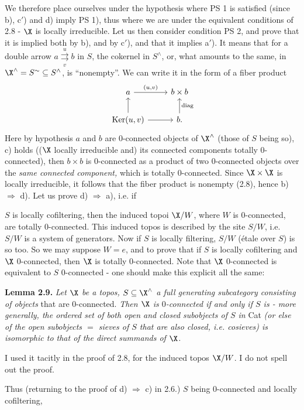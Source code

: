 We therefore place ourselves under the hypothesis where PS 1 is satisfied (since b), c$'$) and d) imply PS 1), thus where we are under the equivalent conditions of 2.8 - $\X$ is locally irreducible. Let us then consider condition PS 2, and prove that it is implied both by b), and by c$'$), and that it implies a$'$). It means that for a double arrow $a\overset{u}{\underset{v}{\rightrightarrows}}b$ in $S$, the cokernel in $S^\wedge$, or, what amounts to the same, in $\X^\wedge=S^\sim\subseteq S^\wedge$, is ``nonempty''. We can write it in the form of a fiber product
\[
\begin{tikzcd}
a \arrow[r, "{\scriptstyle (u,v)}"] & b\times b \\
\operatorname{Ker}(u,v) \arrow[u] \arrow[r] & b. \arrow[u, "\mathrm{diag}"']
\end{tikzcd}
\]
Here by hypothesis $a$ and $b$ are 0-connected objects of $\X^\wedge$ (those of $S$ being so), c) holds (($\X$ locally irreducible and) its connected components totally 0-connected), then $b\times b$ is 0-connected as a product of two 0-connected objects over the \textit{same connected component,} which is totally 0-connected. Since $\X\times\X$ is locally irreducible, it follows that the fiber product is nonempty (2.8), hence b) $\Longrightarrow$ d). Let us prove d) $\Longrightarrow$ a), i.e. if

$S$ is locally cofiltering, then the induced topoi $\X/W$, where $W$ is 0-connected, are totally 0-connected. This induced topos is described by the site $S/W$, i.e. $S/W$ is a system of generators. Now if $S$ is locally filtering, $S/W$ (étale over $S$) is so too. So we may suppose $W=e$, and to prove that if $S$ is locally cofiltering and $\X$ 0-connected, then $\X$ is totally 0-connected. Note that $\X$ 0-connected is equivalent to $S$ 0-connected - one should make this explicit all the same:

\textbf{Lemma 2.9.} \textit{Let $\X$ be a topos, $S\subseteq\X^\wedge$ a full generating subcategory consisting of objects} that are 0-connected. \textit{Then $\X$ is $0$-connected if and only if $S$ is - more generally, the ordered set of both open and closed subobjects of $S$ in} Cat \textit{(or else of the
open subobjects $=$ sieves of $S$ that are also closed, i.e. cosieves) is isomorphic to that of the direct summands of $\X$.}

I used it tacitly in the proof of 2.8, for the induced topos $\X/W$. I do not spell out the proof.

Thus (returning to the proof of d) $\Longrightarrow$ c) in 2.6.) $S$ being 0-connected and locally cofiltering,

